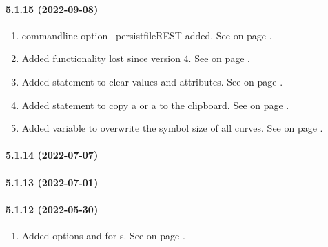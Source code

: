\paragraph{5.1.15 (2022-09-08)}  %
\begin{enumerate}
\item \INTENS{} commandline option \texttt{--}persistfileREST added.
      See  on page \pageref{sec:cloptions}.
\item Added  functionality lost since \INTENS{} version 4.
      See  on page \pageref{sec:helpfile}.
\item Added statement \ERASE{} to clear values and attributes.
      See  on page \pageref{fu:data:statement}.
\item Added statement to copy a 
      or a  to the clipboard.
      See  on page \pageref{fu:copy:paste:statement}.
\item Added variable \PLOTTWODSYMBOLSIZE{} to overwrite the symbol size of all \PLOTTWOD{} curves.
      See  on page \pageref{par:uiplot2symbolsize}.
\end{enumerate}

\paragraph{5.1.14 (2022-07-07)}  %

\paragraph{5.1.13 (2022-07-01)}  %

\paragraph{5.1.12 (2022-05-30)}  %
\begin{enumerate}
\item Added options \HIDDEN{} and \TRANSIENT{} for \JSON{} \STREAM{}s.
      See  on page \pageref{dia:stjsonoptions}.
\end{enumerate}

